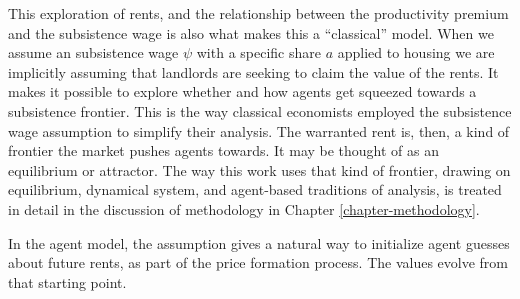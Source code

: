This exploration of rents, and the relationship between the productivity \gls{premium} and the \gls{subsistence wage}
is also what makes this a ``\gls{classical}'' model. 
When we assume an subsistence wage $\psi$ with a specific share $a$ applied to housing we are implicitly assuming that landlords are seeking to claim the value of the rents. It makes it possible to explore whether and how agents get squeezed towards a \gls{subsistence frontier}. %
This is the way classical economists employed the \gls{subsistence wage} assumption to simplify their analysis. 
The warranted rent is, then, a kind of \gls{frontier} the market pushes agents towards. It may be thought of as an \gls{equilibrium} or \gls{attractor}. The way this work uses that kind of frontier, drawing on \gls{equilibrium}, \gls{dynamical system}, and \gls{agent-based} traditions of analysis, is treated in detail in the discussion of methodology in Chapter \ref{chapter-methodology}.

In the agent model, the assumption gives a natural way to initialize agent guesses about future rents, as part of the \gls{price formation} process. The values evolve from that starting point. 

